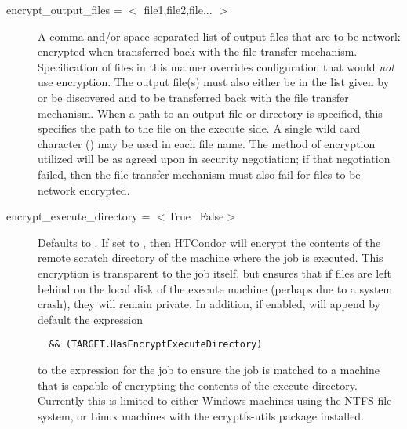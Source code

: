\begin{description}

\label{man-condor-submit-encrypt-output-files}
\item[encrypt\_output\_files = $<$ file1,file2,file... $>$] 
A comma and/or space separated list of output files that are to be
network encrypted when transferred back with the file transfer mechanism.
Specification of files in this manner overrides configuration that would
\emph{not} use encryption.
The output file(s) must also either be in the list given by
 or be discovered and to be transferred
back with the file transfer mechanism.
When a path to an output file or directory is specified, 
this specifies the path to the file on the execute side.
A single wild card character (\Expr{*}) may be used in each file name.
The method of encryption utilized will be as agreed upon in security
negotiation; if that negotiation failed, then the file transfer
mechanism must also fail for files to be network encrypted.


\label{man-condor-submit-encrypt-execute-directory}
\item[encrypt\_execute\_directory = $<$True \Bar\ False$>$]
Defaults to . If set to , then HTCondor will encrypt the
contents of
the remote scratch directory of the machine where the job is executed.
This encryption is transparent to the job itself, but ensures that
if files are left behind on the local disk of the execute machine (perhaps
due to a system crash), they will remain private.
In addition, if enabled,  will append by default
the expression
\begin{verbatim}
  && (TARGET.HasEncryptExecuteDirectory)
\end{verbatim}
to the  expression for the job to ensure
the job is matched to a machine that is capable of encrypting the
contents of the execute directory.  Currently this is limited
to either Windows machines using the NTFS file system, or Linux
machines with the ecryptfs-utils package installed.



\end{description}
